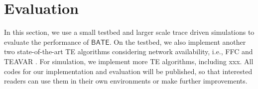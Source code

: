 \documentclass[sigconf]{acmart}
\begin{document}



%  
%

\section{Evaluation} \label{evaluation}
In this section, we use a small testbed and larger scale trace driven simulations  to evaluate the performance of $\mathsf{BATE}$. 
On the testbed, we also implement another two state-of-the-art TE algorithms considering network availability, i.e., FFC \cite{FFC} and TEAVAR \cite{Teavar}. 
For simulation, we implement more TE algorithms, including xxx. 
All codes for our implementation and evaluation will be published, 
so that interested readers can use them in their own environments or make further improvements. 
\end{document}
